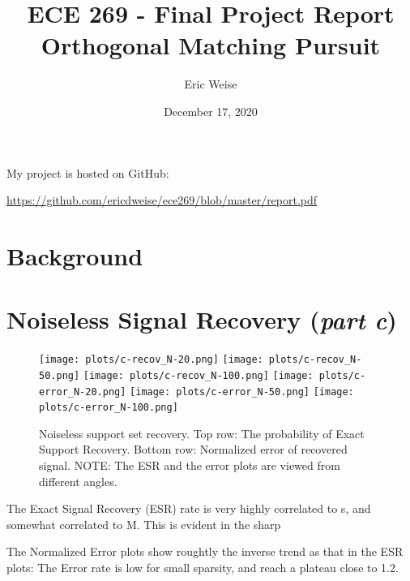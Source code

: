 \documentclass{article}
\title{ECE 269 - Final Project Report\\Orthogonal Matching Pursuit}
\author{Eric Weise}
\date{December 17, 2020}
\begin{document}
\maketitle

My project is hosted on GitHub:

\url{https://github.com/ericdweise/ece269/blob/master/report.pdf}




\section*{Background}












\newpage

\section*{Noiseless Signal Recovery ({\it part c})}


\begin{figure}[H]
    \captionsetup{width=.75\linewidth}
    \centering
        \texttt{[image: plots/c-recov\_N-20.png]}
        \texttt{[image: plots/c-recov\_N-50.png]}
        \texttt{[image: plots/c-recov\_N-100.png]}
        \newline
        \texttt{[image: plots/c-error\_N-20.png]}
        \texttt{[image: plots/c-error\_N-50.png]}
        \texttt{[image: plots/c-error\_N-100.png]}
        \caption{Noiseless support set recovery. Top row: The probability of Exact Support Recovery. Bottom row: Normalized error of recovered signal. NOTE: The ESR and the error plots are viewed from different angles.}
\end{figure}

The Exact Signal Recovery (ESR) rate is very highly correlated to s, and somewhat correlated to M.
This is evident in the sharp 

The Normalized Error plots show roughtly the inverse trend as that in the ESR plots:
The Error rate is low for small sparsity, and reach a plateau close to 1.2.
\end{document}
